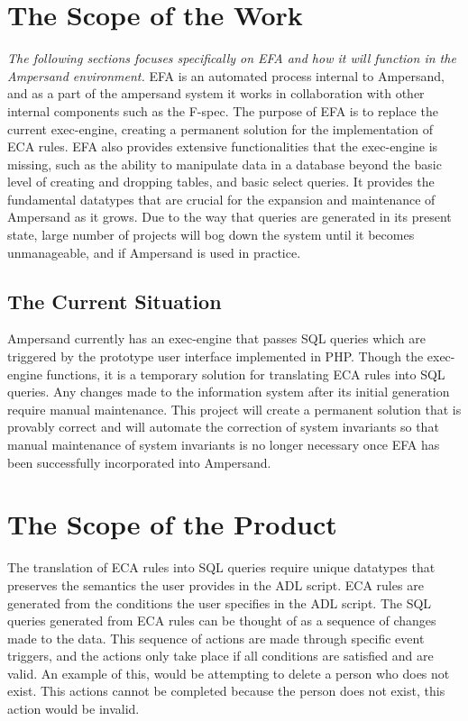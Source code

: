 \documentclass[12pt]{report}
\begin{document}
\section{The Scope of the Work}\label{sec:ScopeOfWork}
\textit{The following sections focuses specifically on EFA and how it will 
function in the Ampersand environment.}
EFA is an automated process internal to Ampersand, and as a part of the 
ampersand system it works in collaboration with other internal components such 
as the F-spec. The purpose of EFA is to replace the current exec-engine, 
creating a permanent solution for the implementation of ECA rules. EFA also 
provides extensive functionalities that the exec-engine is missing, such as the 
ability to manipulate data in a database beyond the basic level of creating and 
dropping tables, and basic select queries. It provides the fundamental 
datatypes that are crucial for the expansion and maintenance of Ampersand as it 
grows. Due to the way that queries are generated in its present state, large 
number of projects will bog down the system until it becomes unmanageable, and 
if Ampersand is used in practice.

\subsection{The Current Situation} %

Ampersand currently has an exec-engine that passes SQL queries which are 
triggered by the prototype user interface implemented in PHP. Though the 
exec-engine functions, it is a temporary solution for translating ECA rules 
into SQL queries. Any changes made to the information system after its initial 
generation require manual maintenance. This project will create a permanent 
solution that is provably correct and will automate the correction of system 
invariants so that manual maintenance of system invariants is no longer 
necessary once EFA has been successfully incorporated into Ampersand.

\section{The Scope of the Product}\label{sec:ScopeOfProduct}
The translation of ECA rules into SQL queries require unique datatypes that 
preserves the semantics the user provides in the ADL script. ECA rules are 
generated from the conditions the user specifies in the ADL script. The SQL 
queries generated from ECA rules can be thought of as a sequence of changes 
made to the data. This sequence of actions are made through specific event 
triggers, and the actions only take place if all conditions are satisfied and 
are valid. An example of this, would be attempting to delete a person who does 
not exist. This actions cannot be completed because the person does not exist, 
this action would be invalid. 
\end{document}
